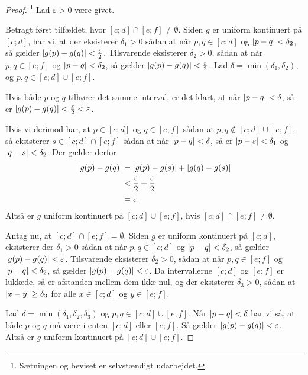 \begin{proof} 
  \footnote{Sætningen og beviset er selvstændigt udarbejdet.}
  Lad $\varepsilon >0$ være givet. 

  Betragt først tilfældet, hvor $[c;d]\cap [e;f]\neq \emptyset $.
  Siden $g$ er uniform kontinuert på $[c;d]$, har vi, at der eksisterer $\delta _1>0$ sådan at når $p, q \in [c;d]$ og $\abs{p-q} <\delta _2$, så gælder $\abs{g(p)-g(q)} < \frac{\varepsilon }{2} $. 
  Tilsvarende eksisterer $\delta _2>0$, sådan at når $p, q \in [e;f]$ og $\abs{p-q} < \delta _2 $, så gælder $\abs{g(p)-g(q)} <\frac{\varepsilon }{2}$. 
  Lad $\delta =\min (\delta _1, \delta _2)$, og $p, q \in [c;d] \cup [e;f]$.

  \noindent Hvis både $p$ og $q$ tilhører det samme interval, er det klart, at når $\abs{p-q}<\delta  $, så er $\abs{g(p)-g(q)} <\frac{\varepsilon }{2} < \varepsilon  $. 

  \noindent Hvis vi derimod har, at $p \in [c;d]$ og $q \in [e;f]$ sådan at $p, q \not\in [c;d] \cup [e;f]$, så eksisterer $s \in [c;d] \cap [e;f]$ sådan at når $\abs{p-q} <\delta $, så er $\abs{p-s} <\delta _1$ og $\abs{q-s} <\delta _2$.
  Der gælder derfor
  \begin{equation*}
  \begin{split}
    \abs{g(p)-g(q)} &= \abs{g(p)-g(s)} + \abs{g(q)-g(s)} \\
  &< \frac{\varepsilon }{2} + \frac{\varepsilon }{2} \\
  &=\varepsilon.
  \end{split}
  \end{equation*}
  Altså er $g$ uniform kontinuert på $[c;d] \cup [e;f]$, hvis $[c;d] \cap [e;f]\neq \emptyset $.

  Antag nu, at $[c;d] \cap [e;f] = \emptyset $.
Siden $g$ er uniform kontinuert på $[c;d]$, eksisterer der $\delta _1>0$ sådan at når $p, q \in [c;d]$ og $\abs{p-q} <\delta _2$, så gælder $\abs{g(p)-g(q)} < \varepsilon$.
Tilsvarende eksisterer $\delta _2>0$, sådan at når $p, q \in [e;f]$ og $\abs{p-q} < \delta _2 $, så gælder $\abs{g(p)-g(q)} <\varepsilon$. 
  Da intervallerne $[c;d]$ og $[e;f]$ er lukkede, så er afstanden mellem dem ikke nul, og der eksisterer $\delta _3>0$, sådan at $\abs{x-y}\geq \delta _3$ for alle $x \in [c;d]$ og $y \in [e;f]$.

  \noindent Lad $\delta = \min (\delta _1, \delta _2, \delta _3)$ og $p, q \in [c;d] \cup [e;f]$.
  Når $\abs{p-q} <\delta $ har vi så, at både $p$ og $q$ må være i enten $[c;d]$ eller $[e;f]$.
  Så gælder $\abs{g(p)-g(q)} <\varepsilon $.
  Altså er $g$ uniform kontinuert på $[c;d] \cup [e;f]$. 
\end{proof}

